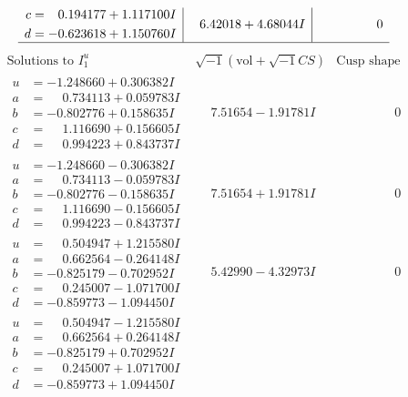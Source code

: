 \documentclass[1p]{elsarticle_modified}
\theoremstyle{definition}
\newcommand{\I}{\sqrt{-1}}
\begin{document}
$$\begin{array}{c|c|c}
\begin{aligned}
c &= \phantom{-}0.194177 + 1.117100 I \\
d &= -0.623618 + 1.150760 I\end{aligned}
 & \phantom{-}6.42018 + 4.68044 I & \phantom{-0.000000 } 0\\
 \hline 
 \end{array}$$\newpage$$\begin{array}{c|c|c}  
\text{Solutions to }I^u_{1}& \I (\text{vol} + \sqrt{-1}CS) & \text{Cusp shape}\\
 \hline 
\begin{aligned}
u &= -1.248660 + 0.306382 I \\
a &= \phantom{-}0.734113 + 0.059783 I \\
b &= -0.802776 + 0.158635 I \\
c &= \phantom{-}1.116690 + 0.156605 I \\
d &= \phantom{-}0.994223 + 0.843737 I\end{aligned}
 & \phantom{-}7.51654 - 1.91781 I & \phantom{-0.000000 } 0 \\ \hline\begin{aligned}
u &= -1.248660 - 0.306382 I \\
a &= \phantom{-}0.734113 - 0.059783 I \\
b &= -0.802776 - 0.158635 I \\
c &= \phantom{-}1.116690 - 0.156605 I \\
d &= \phantom{-}0.994223 - 0.843737 I\end{aligned}
 & \phantom{-}7.51654 + 1.91781 I & \phantom{-0.000000 } 0 \\ \hline\begin{aligned}
u &= \phantom{-}0.504947 + 1.215580 I \\
a &= \phantom{-}0.662564 - 0.264148 I \\
b &= -0.825179 - 0.702952 I \\
c &= \phantom{-}0.245007 - 1.071700 I \\
d &= -0.859773 - 1.094450 I\end{aligned}
 & \phantom{-}5.42990 - 4.32973 I & \phantom{-0.000000 } 0 \\ \hline\begin{aligned}
u &= \phantom{-}0.504947 - 1.215580 I \\
a &= \phantom{-}0.662564 + 0.264148 I \\
b &= -0.825179 + 0.702952 I \\
c &= \phantom{-}0.245007 + 1.071700 I \\
d &= -0.859773 + 1.094450 I\end{aligned}

\end{array}$$
\end{document}
